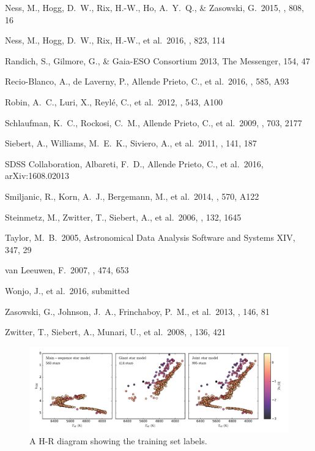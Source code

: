 \documentclass[preprint,trackchanges]{aastex}
\begin{document}
\begin{thebibliography}{dummy}
 Ness, M., Hogg, D.~W., Rix, H.-W., Ho, A.~Y.~Q., \& Zasowski, G.\ 2015, \apj, 808, 16 

 Ness, M., Hogg, D.~W., Rix, H.-W., et al.\ 2016, \apj, 823, 114 

 Randich, S., Gilmore, G., \& Gaia-ESO Consortium 2013, The Messenger, 154, 47 

 Recio-Blanco, A., de Laverny, P., Allende Prieto, C., et al.\ 2016, \aap, 585, A93 

 Robin, A.~C., Luri, X., Reyl{\'e}, C., et al.\ 2012, \aap, 543, A100 

 Schlaufman, K.~C., Rockosi, C.~M., Allende Prieto, C., et al.\ 2009, \apj, 703, 2177 

 Siebert, A., Williams, M.~E.~K., Siviero, A., et al.\ 2011, \aj, 141, 187 

 SDSS Collaboration, Albareti, F.~D., Allende Prieto, C., et al.\ 2016, arXiv:1608.02013 

 Smiljanic, R., Korn, A.~J., Bergemann, M., et al.\ 2014, \aap, 570, A122 

 Steinmetz, M., Zwitter, T., Siebert, A., et al.\ 2006, \aj, 132, 1645 

 Taylor, M.~B.\ 2005, Astronomical Data Analysis Software and Systems XIV, 347, 29 

 van Leeuwen, F.\ 2007, \aap, 474, 653 

 Wonjo, J., et al.\ 2016, submitted

 Zasowski, G., Johnson, J.~A., Frinchaboy, P.~M., et al.\ 2013, \aj, 146, 81 

 Zwitter, T., Siebert, A., Munari, U., et al.\ 2008, \aj, 136, 421 

\end{thebibliography}

\clearpage

\begin{figure}[p]
\includegraphics[width=\textwidth]{figures/hrd-train-set.pdf}
\caption{A H-R diagram showing the training set labels.\label{fig:training-set-hrd}}
\end{figure}
\end{document}
